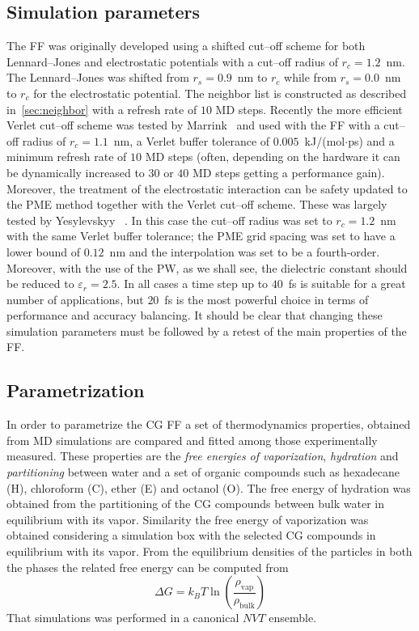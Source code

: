 \subsection{Simulation parameters}
The \martini \ac{FF} was originally developed using a shifted cut--off scheme for both Lennard--Jones and electrostatic potentials with a cut--off radius of $r_c = 1.2$~nm. The Lennard--Jones was shifted from $r_s = 0.9$~nm to $r_c$ while from $r_s = 0.0$~nm to $r_c$ for the electrostatic potential. The neighbor list is constructed as described in~\ref{sec:neighbor} with a refresh rate of $10$ \ac{MD} steps. Recently the more efficient Verlet cut--off scheme was tested by Marrink \etal\, \cite{MartiniReview} and used with the \martini \ac{FF} with a cut--off radius of $r_c = 1.1$~nm, a Verlet buffer tolerance of $0.005$~kJ/(mol$\cdot$ps) and a minimum refresh rate of $10$ \ac{MD} steps (often, depending on the hardware it can be dynamically increased to $30$ or $40$ \ac{MD} steps getting a performance gain).  Moreover, the treatment of the electrostatic interaction can be safety updated to the \ac{PME} method together with the Verlet cut--off scheme. These was largely tested by Yesylevskyy \etal\, \cite{PW}. In this case the cut--off radius was set to $r_c = 1.2$~nm with the same Verlet buffer tolerance; the \ac{PME} grid spacing was set to have a lower bound of $0.12$~nm and the interpolation was set to be a fourth-order. Moreover, with the use of the \ac{PW}, as we shall see, the dielectric constant should be reduced to $\varepsilon_r = 2.5$. In all cases a time step up to $40$~fs is suitable for a great number of applications, but $20$~fs is the most powerful choice in terms of performance and accuracy balancing. It should be clear that changing these simulation parameters must be followed by a retest of the main properties of the \martini \ac{FF}.

\subsection{Parametrization}
In order to parametrize the \martini \ac{CG} \ac{FF} a set of thermodynamics properties, obtained from \ac{MD} simulations are compared and fitted among those experimentally measured. These properties are the \textit{free energies of vaporization}, \textit{hydration} and \textit{partitioning} between water and a set of organic compounds such as hexadecane (H), chloroform (C), ether (E) and octanol (O). The free energy of hydration was obtained from the partitioning of the \ac{CG} compounds between bulk water in equilibrium with its vapor. Similarity the free energy of vaporization was obtained considering a simulation box with the selected \ac{CG} compounds in equilibrium with its vapor. From the equilibrium densities of the particles in both the phases the related free energy can be computed from
\begin{equation*}
	\Delta G = k_B T\ln \left ( \frac{\rho_{\text{vap}}}{\rho_{\text{bulk}}} \right )
\end{equation*}
That simulations was performed in a canonical $NVT$ ensemble.

